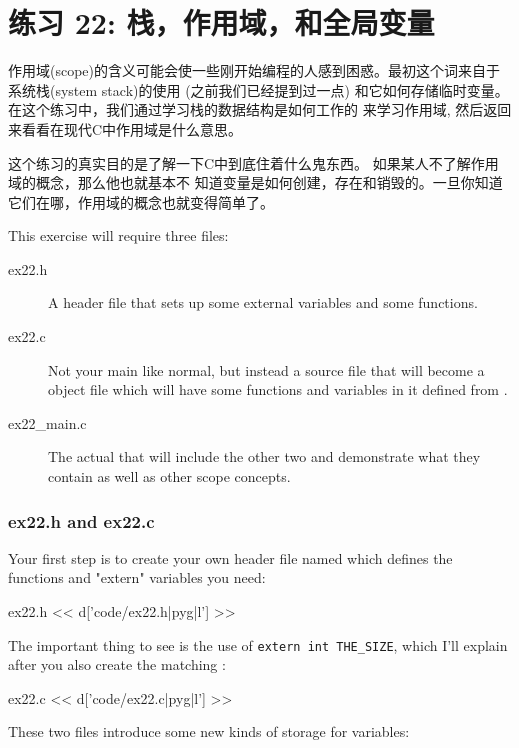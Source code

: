 ﻿\chapter{练习 22: 栈，作用域，和全局变量}

作用域(scope)的含义可能会使一些刚开始编程的人感到困惑。最初这个词来自于系统栈(system stack)的使用
(之前我们已经提到过一点) 和它如何存储临时变量。 在这个练习中，我们通过学习栈的数据结构是如何工作的
来学习作用域, 然后返回来看看在现代C中作用域是什么意思。

这个练习的真实目的是了解一下C中到底住着什么鬼东西。 如果某人不了解作用域的概念，那么他也就基本不
知道变量是如何创建，存在和销毁的。一旦你知道它们在哪，作用域的概念也就变得简单了。

This exercise will require three files:

\begin{description}
\item[ex22.h] A header file that sets up some external variables and some functions.
\item[ex22.c] Not your main like normal, but instead a source file that will become
    a object file  which will have some functions and variables in it
    defined from .
\item[ex22\_main.c] The actual  that will include the other two and
    demonstrate what they contain as well as other scope concepts.
\end{description}

\subsection{ex22.h and ex22.c}

Your first step is to create your own header file named  which
defines the functions and "extern" variables you need:

\begin{code}{ex22.h}
<< d['code/ex22.h|pyg|l'] >>
\end{code}

The important thing to see is the use of \verb|extern int THE_SIZE|, which I'll
explain after you also create the matching :

\begin{code}{ex22.c}
<< d['code/ex22.c|pyg|l'] >>
\end{code}

These two files introduce some new kinds of storage for variables:

